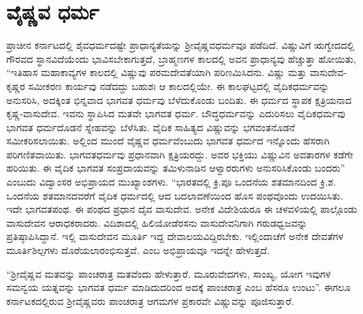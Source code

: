 \section*{ವೈಷ್ಣವ ಧರ್ಮ}

ಪ್ರಾಚೀನ ಕರ್ನಾಟದಲ್ಲಿ ಶೈವಧರ್ಮದಷ್ಟೇ ಪ್ರಾಧಾನ್ಯತೆಯನ್ನು ಶ‍್ರೀವೈಷ್ಣವಧರ್ಮವೂ ಪಡೆದಿದೆ. ವಿಷ್ಣುವಿಗೆ ಋಗ್ವೇದದಲ್ಲಿ ಗೌರವದ ಸ್ಥಾನವಿದೆಯೆಂದು ಭಾವಿಸಬೇಕಾಗುತ್ತದೆ, ಬ್ರಾಹ್ಮಣಗಳ ಕಾಲದಲ್ಲಿ ಅವನ ಪ್ರಾಧಾನ್ಯವು ಹೆಚ್ಚುತ್ತಾ ಹೋಯಿತು, “ಇತಿಹಾಸ ಮಹಾಕಾವ್ಯಗಳ ಕಾಲದಲ್ಲಿ ವಿಷ್ಣುವು ಪರಮದೇವತೆಯಾಗಿ ಪರಿಣಮಿಸಿದನು. ವಿಷ್ಣು ಮತ್ತು ವಾಸುದೇವ-\-ಕೃಷ್ಣರ ಸಮೀಕರಣ ಕಾರ್ಯವು ನಡೆದದ್ದು ಬಹುಶಃ ಆ ಕಾಲದಲ್ಲಿಯೇ. ಈ ಕಾಲಘಟ್ಟದಲ್ಲಿ ವೈದಿಕಧರ್ಮವನ್ನು ಅನುಸರಿಸಿ, ಅದಕ್ಕಿಂತ ಭಿನ್ನವಾದ ಭಾಗವತ ಧರ್ಮವು ಬೆಳೆದುಕೊಂಡು ಬಂದಿತು. ಈ ಧರ್ಮದ ಸ್ಥಾಪಕ ಕ್ಷತ್ರಿಯನಾದ ಕೃಷ್ಣ-\-ವಾಸುದೇವ. ಇವನು ಸ್ಥಾಪಿಸಿದ ಮತವೇ ಭಾಗವತ ಧರ್ಮ. ಬೌದ್ಧಧರ್ಮವನ್ನು ಎದುರಿಸಲು ವೈದಿಕಧರ್ಮವು ಭಾಗವತ ಧರ್ಮದೊಡನೆ ಸ್ನೇಹವನ್ನು ಬೆಳೆಸಿತು. ವೈದಿಕ ಸಾಹಿತ್ಯದ ವಿಷ್ಣುವನ್ನು ಭಗವಂತನೊಡನೆ ಸಮೀಕರಿಸಲಾಯಿತು. ಅಲ್ಲಿಂದ ಮುಂದೆ ವೈಷ್ಣವ ಧರ್ಮವೆಂಬುದು ಭಾಗವತ ಧರ್ಮದ ಇನ್ನೊಂದು ಹೆಸರಾಗಿ ಪರಿಗಣಿತವಾಯಿತು. ಭಾಗವತಧರ್ಮವು ಪ್ರಧಾನವಾಗಿ ಕ್ಷತ್ರಿಯರದ್ದು. ಅವರ ಭಕ್ತಿಯು ವಿಷ್ಣುವಿನ ಅವತಾರಗಳ ಕಡೆಗೇ ಹರಿಯಿತು. ಈ ವೈದಿಕ ಭಾಗವತ ಸಂಪ್ರದಾಯವನ್ನು ತಮಿಳುನಾಡಿನ ಆಳ್ವಾರರುಗಳು ಅನುಸರಿಸಿಕೊಂಡು ಬಂದರು” ಎಂಬುದು ವಿದ್ವಾಂಸರ ಅಭಿಪ್ರಾಯದ ಮುಖ್ಯಾಂಶಗಳು. “ಭಾರತದಲ್ಲಿ ಕ್ರಿ.ಪೂ ಒಂದನೆಯ ಶತಮಾನದಿಂದ ಕ್ರಿ.ಶ. ಒಂದನೆಯ ಶತಮಾನದವರೆಗೆ ವೈದಿಕ ಧರ್ಮದಲ್ಲಿ ಆದ ಬದಲಾವಣೆಯಿಂದ ಹೊಸ ಪಂಥವೊಂದು ಉದಯಿಸಿತು. ಇದೇ ಭಾಗವತಪಂಥ. ಈ ಪಂಥದ ಪ್ರಧಾನ ದೈವ ವಾಸುದೇವ. ಅನೇಕ ವಿದೇಶಿಯರೂ ಈ ಚಳವಳಿಯಲ್ಲಿ ಪಾಲ್ಗೊಂಡು ವಾಸುದೇವನ ಆರಾಧಕರಾದರು. ವಿದಿಶಾದಲ್ಲಿ ಹಿಲಿಯೋಡೆರಸನು ವಾಸುದೇವನಿಗಾಗಿ ಗರುಡಧ್ವಜವನ್ನು ಪ್ರತಿಷ್ಠಾಪಿಸಿದ್ದಾನೆ. ಇಲ್ಲಿ ವಾಸುದೇವನ ಮೂರ್ತಿ ಇದ್ದ ದೇವಾಲಯವಿದ್ದಿರಬೇಕು. ಇಲ್ಲಿಂದಾಚೆಗೆ ಅನೇಕ ದೇವತೆಗಳ ಮೂರ್ತಿಶಿಲ್ಪಗಳು ದೊರೆಯಲಾರಂಭಿಸುತ್ತವೆ. ಎಂಬ ಅಭಿಪ್ರಾಯವೂ ಇದನ್ನೇ ಹೇಳುತ್ತದೆ.

“ಶ‍್ರೀವೈಷ್ಣವ ಮತವನ್ನು ಪಾಂಚರಾತ್ರ ಮತವೆಂದು ಹೇಳುತ್ತಾರೆ. ಮೂರುವೇದಗಳು, ಸಾಂಖ್ಯ, ಯೋಗ ಇವುಗಳ ಸಮನ್ವಯ ಯತ್ನವನ್ನು ಭಾಗವತ ಧರ್ಮ ಮಾಡಿದುದರಿಂದ ಅದಕ್ಕೆ ಪಾಂಚರಾತ್ರ ಎಂಬ ಹೆಸರೂ ಉಂಟು”. ಈಗಲೂ ಕರ್ನಾಟಕದಲ್ಲಿರುವ ಶ‍್ರೀವೈಷ್ಣವರು ಪಾಂಚರಾತ್ರ ಆಗಮಗಳ ಪ್ರಕಾರವೇ ವಿಷ್ಣುವನ್ನು ಪೂಜಿಸುತ್ತಾರೆ.

